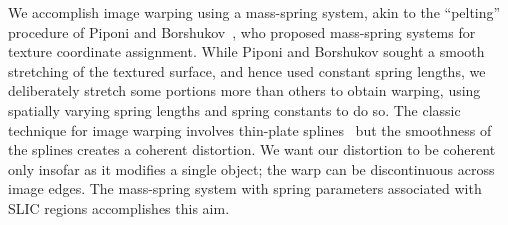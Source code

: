 We accomplish image warping using a
mass-spring system, akin to the ``pelting'' procedure of Piponi and
Borshukov~\cite{pelting}, who proposed mass-spring systems for texture
coordinate assignment. While Piponi and Borshukov sought a smooth stretching of
the textured surface, and hence used constant spring lengths, we deliberately
stretch some portions more than others to obtain warping, using spatially
varying spring lengths and spring constants to do so. The classic technique for
image warping involves thin-plate splines~\cite{tpswarp}
but the
smoothness of the splines creates a coherent distortion. We want our distortion
to be coherent only insofar as it modifies a single object; the warp can be
discontinuous across image edges. The mass-spring system with spring parameters
associated with SLIC regions accomplishes this aim.
